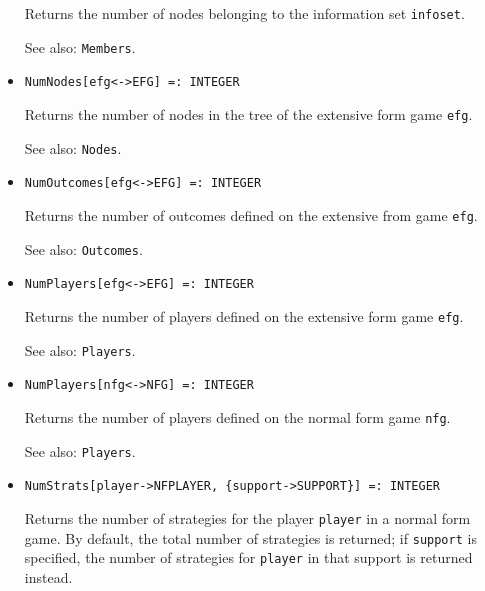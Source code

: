 \begin{itemize}
\bd
Returns the number of nodes belonging to the information
set \verb+infoset+.
\item
[See also:] {\tt Members}.
\ed

\item
\protect \large \begin{verbatim}
NumNodes[efg<->EFG] =: INTEGER
\end{verbatim}\normalsize

\bd
Returns the number of nodes in the tree of the extensive form
game \verb+efg+.
\item
[See also:] {\tt Nodes}.
\ed

\item
\protect \large \begin{verbatim}
NumOutcomes[efg<->EFG] =: INTEGER
\end{verbatim} \normalsize

\bd
Returns the number of outcomes defined on the extensive from
game \verb+efg+.
\item
[See also:] {\tt Outcomes}.
\ed

\item
\protect \large \begin{verbatim}
NumPlayers[efg<->EFG] =: INTEGER
\end{verbatim} \normalsize

\bd
Returns the number of players defined on the extensive form
game \verb+efg+.
\item
[See also:] {\tt Players}.
\ed

\item
\protect \large \begin{verbatim}
NumPlayers[nfg<->NFG] =: INTEGER
\end{verbatim} \normalsize

\bd
Returns the number of players defined on the normal form
game \verb+nfg+.
\item
[See also:] {\tt Players}.
\ed

\item
\protect \large \begin{verbatim}
NumStrats[player->NFPLAYER, {support->SUPPORT}] =: INTEGER
\end{verbatim}\normalsize

\bd
Returns the number of strategies for the player \verb+player+
in a normal form game.  By default, the total number of strategies is
returned; if \verb+support+ is specified, the number of strategies
for \verb+player+ in that support is returned instead.
\ed


\end{itemize}
